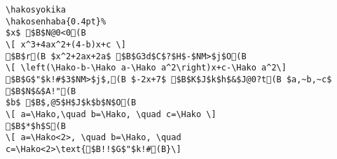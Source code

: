 \begin{verbatim}
\hakosyokika
\hakosenhaba{0.4pt}%
$x$ $B$N@0<0(B
\[ x^3+4ax^2+(4-b)x+c \]
$B$r(B $x^2+2ax+2a$ $B$G3d$C$?$H$-$NM>$j$O(B
\[ \left(\Hako-b-\Hako a-\Hako a^2\right)x+c-\Hako a^2\]
$B$G$"$k!#$3$NM>$j$,(B $-2x+7$ $B$K$J$k$h$&$J@0?t(B $a,~b,~c$ $B$N$&$A!"(B
$b$ $B$,@5$H$J$k$b$N$O(B
\[ a=\Hako,\quad b=\Hako, \quad c=\Hako \]
$B$*$h$S(B
\[ a=\Hako<2>, \quad b=\Hako, \quad c=\Hako<2>\text{$B!!$G$"$k!#(B}\]
\end{verbatim}
